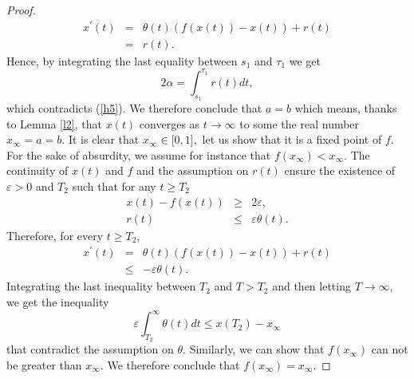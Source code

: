 \documentclass[10pt,a4paper]{amsart}
\begin{document}
\begin{proof}
\begin{eqnarray*}
x^{\prime }(t) &=&\theta (t)(f(x(t))-x(t))+r(t) \\
&=&r(t).
\end{eqnarray*}%
Hence, by integrating the last equality between $s_{1}$ and $\tau _{1}$ we
get
\[
2\alpha =\int_{s_{1}}^{\tau _{1}}r(t)dt,
\]%
which contradicts (\ref{h5}). We therefore conclude that $a=b$ which means,
thanks to Lemma \ref{l2}, that $x(t)$ converges as $t\rightarrow \infty $ to some the
real number $x_{\infty }=a=b.$ It is clear that $x_{\infty }\in
\lbrack 0,1],$ let us show that it is a fixed point of $f.$ For the sake of
absurdity, we assume for instance that $f(x_{\infty })<x_{\infty }.$ The
continuity of $x(t)$ and $f$ and the assumption on $r(t)$ ensure the
existence of $\varepsilon >0$ and $T_{2}$ such that for any $t\geq T_{2}$%
\begin{eqnarray*}
x(t)-f(x(t)) &\geq &2\varepsilon , \\
r(t) &\leq &\varepsilon \theta (t).
\end{eqnarray*}%
Therefore, for every $t\geq T_{2},$
\begin{eqnarray*}
x^{\prime }(t) &=&\theta (t)(f(x(t))-x(t))+r(t) \\
&\leq &-\varepsilon \theta (t).
\end{eqnarray*}%
Integrating the last inequality between $T_{2}$ and $T>T_{2}$ and then letting $%
T\rightarrow \infty ,$ we get the inequality%
\[
\varepsilon \int_{T_{2}}^{\infty }\theta (t)dt\leq x(T_{2})-x_{\infty }
\]%
that contradict the assumption on $\theta .$ Similarly, we can show that
$f(x_{\infty })$ can not be greater than $x_{\infty }.$ We therefore
conclude that $f(x_{\infty })=x_{\infty }.$
\end{proof}
\end{document}
